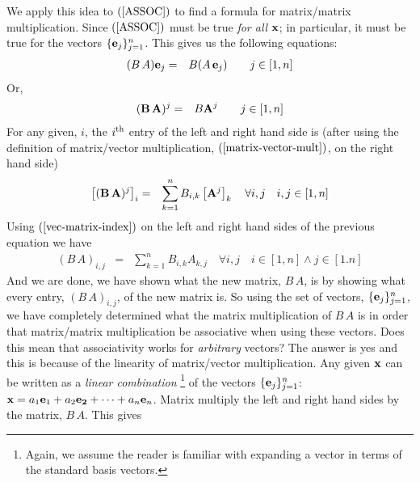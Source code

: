 \documentclass{article}
\begin{document}
We apply this idea to $(\ref{ASSOC})$ to find a formula for matrix/matrix multiplication.
Since $(\ref{ASSOC})$ must be true {\em for all\/} ${\bf x}$; in particular, it must be
true for the vectors $\{{\bf e}_j\}_{j=1}^n$.
This gives us the following equations:
\begin{eqnarray}
	(B \, A) {\bf e}_j & = & B (A \, {\bf e}_j) \quad\quad \text{$j \in [1,n]$} 
\end{eqnarray}
Or,
\begin{eqnarray}
	({\bf B} \, {\bf A})^j & = & B  {\bf A}^j \quad\quad \text{$j \in [1, n]$}
\end{eqnarray}
For any given, $i$, the $i^{\rm th}$ entry of the left and right hand side is
(after using the definition of matrix/vector 
multiplication, $(\ref{matrix-vector-mult})$, on the right hand side)
\begin{eqnarray}
	\left[({\bf B} \, {\bf A})^j\right]_i & = & \sum_{k=1}^n B_{i,k}  \left[{\bf A}^j\right]_k  \quad \forall i,j \quad i,j \in [1, n]
\end{eqnarray}
Using $(\ref{vec-matrix-index})$ on the left and right hand sides of the previous equation we have
\begin{eqnarray}
	(B \, A)_{i, j} & = & \sum_{k=1}^n B_{i, k}  A_{k, j}  \quad \forall i,j \quad i \in [1, n] \wedge j \in [1.n] \label{matrix-matrix-mult}
\end{eqnarray}
And we are done, we have shown what the new matrix, $B \, A$, is by showing what every entry, $(B\, A)_{i, j}$, of
the new matrix is.
So using the set of vectors, $\{{\bf e}_j\}_{j=1}^n$, we have completely determined what 
the matrix multiplication of $B \, A$ is in order that matrix/matrix multiplication be 
associative when using these vectors. Does this mean that associativity works for 
{\em arbitrary\/} vectors? The answer is yes and this is because of the linearity of
matrix/vector multiplication. Any given ${\bf x}$ can be written as a {\em linear combination\/}%
\footnote{Again, we assume the reader is familiar with expanding a vector in terms of the standard basis vectors.}
of the vectors $\{{\bf e}_j\}_{j=1}^n$: ${\bf x} = a_1 {\bf e}_1 + a_2 {\bf e_2} + \cdots + a_n {\bf e}_n$.
Matrix multiply the left and right hand sides by the matrix, $B\,A$. This gives
\end{document}
